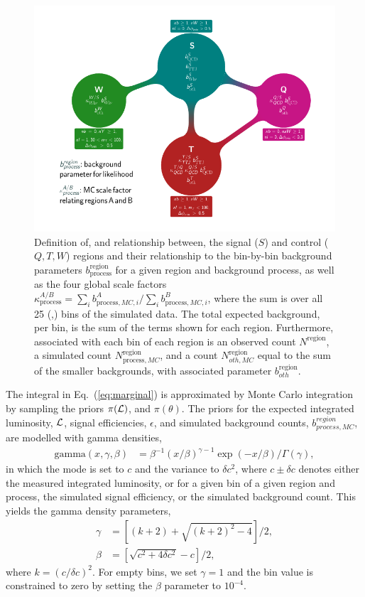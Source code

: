 \begin{figure}[p]
  \centering
  \includegraphics[width=\textwidth]{figures/razor_strategy/BoostFlowChart_noZ}
  \caption{Definition of, and relationship between, the signal ($S$) and control ($Q,T,W$) regions
and their relationship to the bin-by-bin background parameters
$b^{\textrm{region}}_{\textrm{process}}$ for a given region and background process, as well as the
four global scale factors $\kappa^{A/B}_{\textrm{process}} = \sum_i b^A_{\textrm{process}, MC, i} /
\sum_i b^B_{\textrm{process}, MC, i}$, where the sum is over all 25 (\mr,\rsq) bins of the simulated
data. 
The total expected background, per bin, is the sum of the terms shown for each region. Furthermore,
associated with each bin of each region is an observed count $N^{\textrm{region}}$, a simulated
count $N^{\textrm{region}}_{\textrm{process}, MC}$, and a count $N^{\textrm{region}}_{oth, MC}$
equal to the sum of the smaller backgrounds, with associated parameter $b^{\textrm{region}}_{oth}$.
  \label{fig:boost_flowchart}}
\end{figure}

The integral in Eq.~(\ref{eq:marginal}) is approximated by Monte Carlo integration by sampling
 the priors $\pi({\cal L})$, and  $\pi(\theta)$. 
The priors for the expected integrated luminosity, ${\cal L}$, signal efficiencies, $\epsilon$, and 
simulated background counts, $b^{region}_{process, MC}$, are modelled with gamma densities,
\begin{align}
\textrm{gamma}(x, \gamma, \beta) &= \beta^{-1}(x/\beta)^{\gamma-1} \exp(-x / \beta) /
\Gamma(\gamma),
\label{eq:gamma}
\end{align}
in which the mode is set to $c$ and the variance to $\delta c^2$, 
where $c \pm \delta c$ denotes either the measured integrated luminosity, or for a given bin of
a given region and process, the simulated signal efficiency, or the simulated background count. This
yields the gamma density parameters,
\begin{align}
   \gamma &= [(k + 2) + \sqrt{(k+2)^2 - 4}]/2,\\
   \beta &= [\sqrt{c^2 + 4\delta c^2} - c]/2,
\end{align}
where $k = (c / \delta c)^2$.
For empty bins, we set $\gamma = 1$ and the bin value is constrained to zero by setting the $\beta$
parameter to $10^{-4}$.
 
